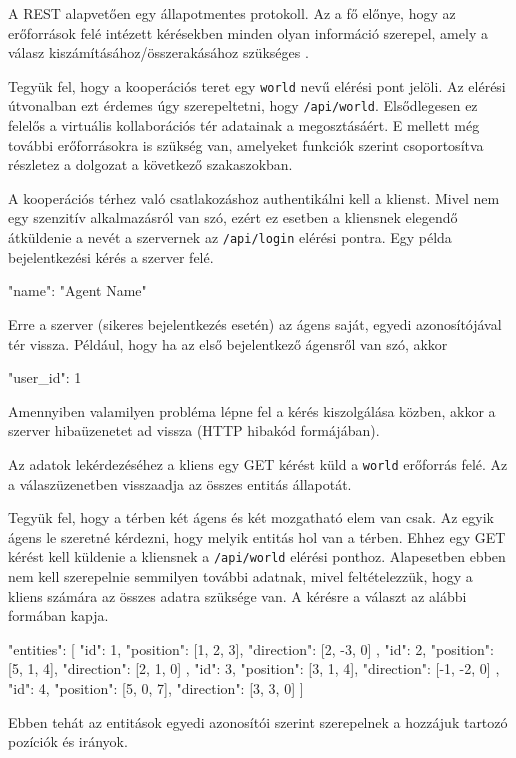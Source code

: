 


A REST alapvetően egy állapotmentes protokoll.
Az a fő előnye, hogy az erőforrások felé intézett kérésekben minden olyan információ szerepel, amely a válasz kiszámításához/összerakásához szükséges \cite{sohan2017study}.

Tegyük fel, hogy a kooperációs teret egy \texttt{world} nevű elérési pont jelöli.
Az elérési útvonalban ezt érdemes úgy szerepeltetni, hogy \texttt{/api/world}.
Elsődlegesen ez felelős a virtuális kollaborációs tér adatainak a megosztásáért.
E mellett még további erőforrásokra is szükség van, amelyeket funkciók szerint csoportosítva részletez a dolgozat a következő szakaszokban.


A kooperációs térhez való csatlakozáshoz authentikálni kell a klienst.
Mivel nem egy szenzitív alkalmazásról van szó, ezért ez esetben a kliensnek elegendő átküldenie a nevét a szervernek az \texttt{/api/login} elérési pontra.
Egy példa bejelentkezési kérés a szerver felé.
\begin{python}
{ "name": "Agent Name" }
\end{python}
Erre a szerver (sikeres bejelentkezés esetén) az ágens saját, egyedi azonosítójával tér vissza.
Például, hogy ha az első bejelentkező ágensről van szó, akkor
\begin{python}
{ "user_id": 1 }
\end{python}
Amennyiben valamilyen probléma lépne fel a kérés kiszolgálása közben, akkor a szerver hibaüzenetet ad vissza (HTTP hibakód formájában).


Az adatok lekérdezéséhez a kliens egy GET kérést küld a \texttt{world} erőforrás felé.
Az a válaszüzenetben visszaadja az összes entitás állapotát.

Tegyük fel, hogy a térben két ágens és két mozgatható elem van csak.
Az egyik ágens le szeretné kérdezni, hogy melyik entitás hol van a térben.
Ehhez egy GET kérést kell küldenie a kliensnek a \texttt{/api/world} elérési ponthoz.
Alapesetben ebben nem kell szerepelnie semmilyen további adatnak, mivel feltételezzük, hogy a kliens számára az összes adatra szüksége van.
A kérésre a választ az alábbi formában kapja.
\begin{python}
{
  "entities": [
    {
      "id": 1,
      "position": [1, 2, 3],
      "direction": [2, -3, 0]
    },
    {
      "id": 2,
      "position": [5, 1, 4],
      "direction": [2, 1, 0]
    },
    {
      "id": 3,
      "position": [3, 1, 4],
      "direction": [-1, -2, 0]
    },
    {
      "id": 4,
      "position": [5, 0, 7],
      "direction": [3, 3, 0]
    }
  ]
}
\end{python}
Ebben tehát az entitások egyedi azonosítói szerint szerepelnek a hozzájuk tartozó pozíciók és irányok.


